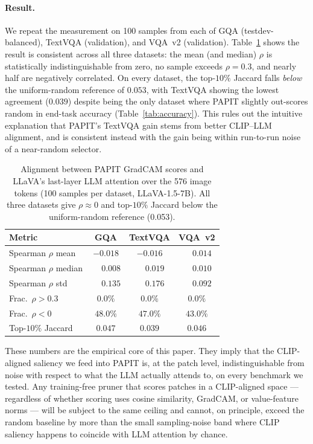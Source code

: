 \documentclass[10pt,twocolumn,letterpaper]{article}
\begin{document}
\paragraph{Result.}
We repeat the measurement on 100 samples from each of GQA
(testdev-balanced), TextVQA (validation), and VQA~v2 (validation).
Table~\ref{tab:diagnostic} shows the result is consistent across all
three datasets: the mean (and median) $\rho$ is statistically
indistinguishable from zero, no sample exceeds $\rho\!=\!0.3$, and
nearly half are negatively correlated. On every dataset, the
top-$10\%$ Jaccard falls \emph{below} the uniform-random reference of
$0.053$, with TextVQA showing the lowest agreement ($0.039$) despite
being the only dataset where PAPIT slightly out-scores random in
end-task accuracy (Table~\ref{tab:accuracy}). This rules out the
intuitive explanation that PAPIT's TextVQA gain stems from better
CLIP--LLM alignment, and is consistent instead with the gain being
within run-to-run noise of a near-random selector.

\begin{table}[htbp]
\centering
\small
\caption{Alignment between PAPIT GradCAM scores and LLaVA's
         last-layer LLM attention over the 576 image tokens
         (100 samples per dataset, LLaVA-1.5-7B).
         All three datasets give $\rho \approx 0$ and top-$10\%$
         Jaccard below the uniform-random reference (0.053).}
\label{tab:diagnostic}
\begin{tabular}{@{}lccc@{}}
\toprule
Metric & GQA & TextVQA & VQA~v2 \\
\midrule
Spearman $\rho$ mean      & $-0.018$ & $-0.016$ & $\phantom{-}0.014$ \\
Spearman $\rho$ median    & $\phantom{-}0.008$ & $\phantom{-}0.019$ & $\phantom{-}0.010$ \\
Spearman $\rho$ std       & $\phantom{-}0.135$ & $\phantom{-}0.176$ & $\phantom{-}0.092$ \\
Frac.\ $\rho>0.3$         & $0.0\%$  & $0.0\%$  & $0.0\%$ \\
Frac.\ $\rho<0$           & $48.0\%$ & $47.0\%$ & $43.0\%$ \\
Top-$10\%$ Jaccard        & $0.047$  & $0.039$  & $0.046$ \\
\bottomrule
\end{tabular}
\end{table}

These numbers are the empirical core of this paper. They imply that
the CLIP-aligned saliency we feed into PAPIT is, at the patch level,
indistinguishable from noise with respect to what the LLM actually
attends to, on every benchmark we tested. Any training-free pruner
that scores patches in a CLIP-aligned space --- regardless of
whether scoring uses cosine similarity, GradCAM, or value-feature
norms --- will be subject to the same ceiling and cannot, on
principle, exceed the random baseline by more than the small
sampling-noise band where CLIP saliency happens to coincide with LLM
attention by chance.
\end{document}

